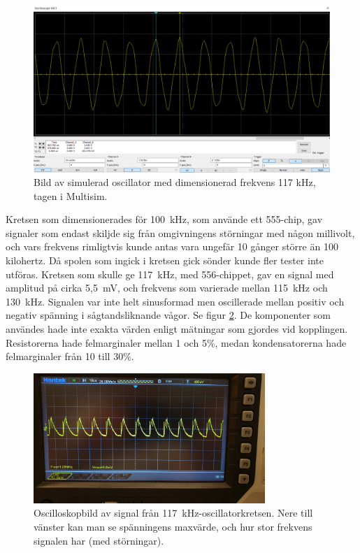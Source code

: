 \documentclass[a4paper]{article}
\makeatletter
\let\\\@raggedtwoe@savedcr%
\makeatother
\begin{document}
\begin{sloppypar}
    \begin{figure}[H]
        \centering
        \includegraphics[width=\textwidth]{multisim-signal-555-117kHz.png}
        \caption{Bild av simulerad oscillator med dimensionerad frekvens 117 kHz, tagen i Multisim.}
        \label{fig:sim-117kHz}
    \end{figure}
    \noindent
    Kretsen som dimensionerades för 100~kHz, som använde ett 555-chip, gav signaler som endast skiljde sig från omgivningens störningar med någon millivolt, och vars frekvens rimligtvis kunde antas vara ungefär 10 gånger större än 100 kilohertz.
    Då spolen som ingick i kretsen gick sönder kunde fler tester inte utföras.
    \\\\
    Kretsen som skulle ge 117~kHz, med 556-chippet, gav en signal med amplitud på cirka 5,5~mV, och frekvens som varierade mellan 115~kHz och 130~kHz.
    Signalen var inte helt sinusformad men oscillerade mellan positiv och negativ spänning i sågtandsliknande vågor. Se figur \ref{fig:signal-117kHz}.
    \\\\
    De komponenter som användes hade inte exakta värden enligt mätningar som gjordes vid kopplingen. Resistorerna hade felmarginaler mellan 1 och 5\%, medan kondensatorerna hade felmarginaler från 10 till 30\%.

    \begin{figure}[H]
        \centering
        \includegraphics[width = 0.78\textwidth]{signal-555-117kHz.jpg}
        \caption{Oscilloskopbild av signal från 117~kHz-oscillatorkretsen. Nere till vänster kan man se spänningens maxvärde, och hur stor frekvens signalen har (med störningar).}
        \label{fig:signal-117kHz}
    \end{figure}



\end{sloppypar}
\end{document}
